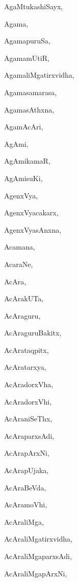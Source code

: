\begin{multicols}{2}
{AgaMtukashiSayx}, \pageref{AgaMtukashiSayx}

{Agama}, \pageref{Agama}

{AgamapuruSa}, \pageref{AgamapuruSa}

{AgamamUtiR}, \pageref{AgamamUtiR}

{AgamaliMgatirxvidha}, \pageref{AgamaliMgatirxvidha}

{Agamasamarasa}, \pageref{Agamasamarasa}

{AgamasAthxna}, \pageref{AgamasAthxna}

{AgamAcAri}, \pageref{AgamAcAri}

{AgAmi}, \pageref{AgAmi}

{AgAmikamaR}, \pageref{AgAmikamaR}

{AgAmisuKi}, \pageref{AgAmisuKi}

{AgenxVya}, \pageref{AgenxVya}

{AgenxVyacakarx}, \pageref{AgenxVyacakarx}

{AgenxVyasAnxna}, \pageref{AgenxVyasAnxna}

{Acamana}, \pageref{Acamana}

{AcaraNe}, \pageref{AcaraNe}

{AcAra}, \pageref{AcAra}

{AcArakUTa}, \pageref{AcArakUTa}

{AcAraguru}, \pageref{AcAraguru}

{AcAraguruBakitx}, \pageref{AcAraguruBakitx}

{AcArataqpitx}, \pageref{AcArataqpitx}

{AcAratarxya}, \pageref{AcAratarxya}

{AcAradorxVha}, \pageref{AcAradorxVha}

{AcAradorxVhi}, \pageref{AcAradorxVhi}

{AcAraniSeThx}, \pageref{AcAraniSeThx}

{AcAraparxsAdi}, \pageref{AcAraparxsAdi}

{AcArapArxNi}, \pageref{AcArapArxNi}

{AcArapUjaka}, \pageref{AcArapUjaka}

{AcAraBeVda}, \pageref{AcAraBeVda}

{AcAramoVhi}, \pageref{AcAramoVhi}

{AcAraliMga}, \pageref{AcAraliMga}

{AcAraliMgatirxvidha}, \pageref{AcAraliMgatirxvidha}

{AcAraliMgaparxsAdi}, \pageref{AcAraliMgaparxsAdi}

{AcAraliMgapArxNi}, \pageref{AcAraliMgapArxNi}


\end{multicols}
